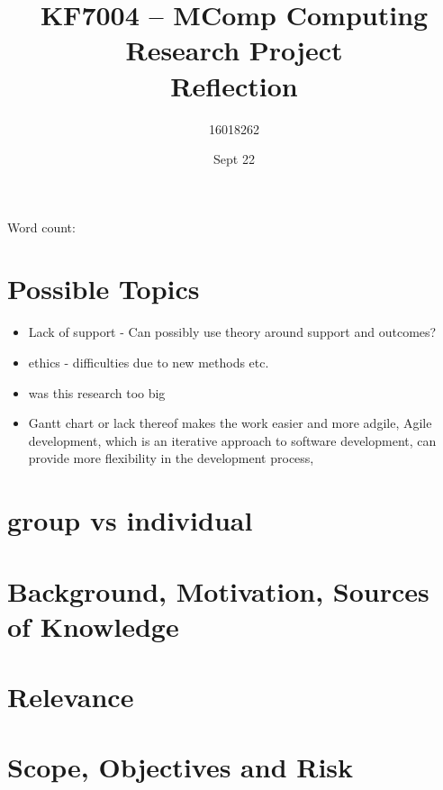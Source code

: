\documentclass[10pt]{article}
\title{KF7004 – MComp Computing Research Project \\ Reflection}
\author{16018262}
\date{Sept 22}
\begin{document}
\maketitle
\begin{center}
	Word count: 
\end{center}
\tableofcontents
\section{Possible Topics}
\begin{itemize}
	\item Lack of support - Can possibly use theory around support and outcomes?
	\item ethics - difficulties due to new methods etc. 
	\item was this research too big
	\item Gantt chart or lack thereof makes the work easier and more adgile, Agile development, which is an iterative approach to software development, can provide more flexibility in the development process,
\end{itemize}
\section{group vs individual}

\section{Background, Motivation, Sources of Knowledge}

\section{Relevance}

\section{Scope, Objectives and Risk}

\printbibliography
\appendix
\end{document}
